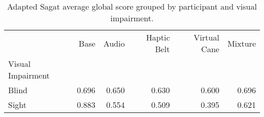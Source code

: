 
\begin{table}[!htb]
\centering
\caption{Adapted Sagat average global score grouped by participant and visual impairment.}
\label{tab:sagat_average_group}
\begin{tabular}{lrrrrr}
\toprule
{} &  Base &  Audio &  Haptic Belt &  Virtual Cane &  Mixture \\
Visual Impairment &       &        &              &               &          \\
\midrule
Blind             & 0.696 &  0.650 &        0.630 &         0.600 &    0.696 \\
Sight             & 0.883 &  0.554 &        0.509 &         0.395 &    0.621 \\
\bottomrule
\end{tabular}
\end{table}

